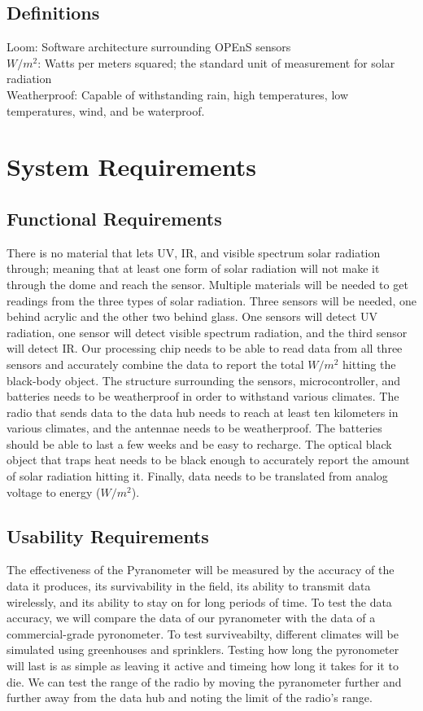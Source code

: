 \documentclass[10pt,draftclsnofoot,onecolumn,letterpaper]{article}
\begin{document}
\subsection{Definitions} Loom: Software architecture surrounding OPEnS sensors\\$W/m^2$: Watts per meters squared; the standard unit of measurement for solar radiation\\Weatherproof: Capable of withstanding rain, high temperatures, low temperatures, wind, and be waterproof.

\section{System Requirements}

\subsection{Functional Requirements}
There is no material that lets UV, IR, and visible spectrum solar radiation through; meaning that at least one form of solar radiation will not make it through the dome and reach the sensor. Multiple materials will be needed to get readings from the three types of solar radiation. Three sensors will be needed, one behind acrylic and the other two behind glass. One sensors will detect UV radiation, one sensor will detect visible spectrum radiation, and the third sensor will detect IR. Our processing chip needs to be able to read data from all three sensors and accurately combine the data to report the total $W/m^2$ hitting the black-body object. The structure surrounding the sensors, microcontroller, and batteries needs to be weatherproof in order to withstand various climates. The radio that sends data to the data hub needs to reach at least ten kilometers in various climates, and the antennae needs to be weatherproof. The batteries should be able to last a few weeks and be easy to recharge. The optical black object that traps heat needs to be black enough to accurately report the amount of solar radiation hitting it. Finally, data needs to be translated from analog voltage to energy ($W/m^2$).

\subsection{Usability Requirements}The effectiveness of the Pyranometer will be measured by the accuracy of the data it produces, its survivability in the field, its ability to transmit data wirelessly, and its ability to stay on for long periods of time. To test the data accuracy, we will compare the data of our pyranometer with the data of a commercial-grade pyronometer. To test surviveabilty, different climates will be simulated using greenhouses and sprinklers. Testing how long the pyronometer will last is as simple as leaving it active and timeing how long it takes for it to die. We can test the range of the radio by moving the pyranometer further and further away from the data hub and noting the limit of the radio's range.
\end{document}
